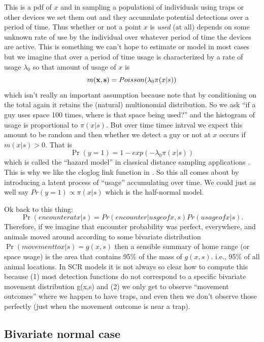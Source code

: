 This is a pdf of $x$ and in sampling a populationi of individuals
using traps or other devices we set them out and they accumulate
potential detections over a period of time. Thus whether or not a
point $x$ is {\it used} (at all) depends on some unknown rate of use
by the individual over whatever period of time the devices are
active. This is something we can't hope to estimate or model in most
cases but we imagine that over a period of time usage is characterized
by a rate of usage $\lambda_{0}$ so that amount of usage of $x$ is
\[
m({\bf x},{\bf s}) = Poisson(\lambda_{0} \pi(x|s) ) 
\]
which isn't really an important assumption because note that by
conditioning on the total again it retains the (natural) multionomial
distribution. So we ask ``if a guy uses space 100 times, where is that
space being used?'' and the histogram of usage is proportional to
$\pi(x|s)$. But over time timee intrval we expect this amount to be
random and then whether we detect a guy or not at $x$ occurs if
$m(x|s)>0$. That is
\begin{equation}
\Pr(y=1) = 1-exp(-\lambda_{0} \pi(x|s))
\label{scr0.eq.hazard}
\end{equation}
which is called the ``hazard model'' in classical distance sampling
applications \citep{buckland_etal:2002}. 
This is why we like the cloglog link function in \citep{royle_etal:2009ecol}.
So this all comes about by introducing a latent process of ``usage''
accumulating over time.    
We could just as well say $Pr(y=1) \propto \pi(x|s)$ which is the
half-normal model. 

Ok back to this thing: 
\[
 \Pr(encounter at x|s) = Pr(encounter | usge of x,s) Pr(usage of x|s).
\]
Therefore, if we imagine that encounter probability was perfect,
everywhere, and animals moved around according to some bivariate
distribution $\Pr(movement to x | s) = g(x,s)$ then a sensible summary
of home range (or space usage) is the area that contains 95\% of the
mass of $g(x,s)$. i.e., 95\% of all animal locations.  In SCR models it
is not always so clear how to compute this because (1) most detection
functions do not correspond to a specific bivariate movement
distribution g(x,s) and (2) we only get to observe ``movement outcomes''
where we happen to have traps, and even then we don't observe those
perfectly (just when the movement outcome is near a trap).


\subsection{Bivariate normal case}  

